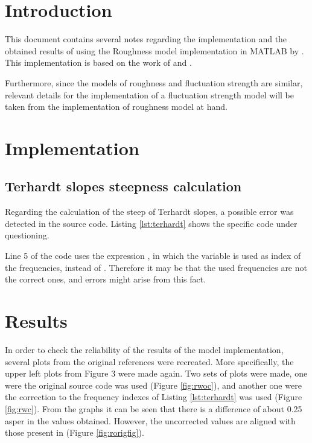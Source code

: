 \documentclass[a4paper]{article}
\begin{document}

\section{Introduction} 

This document contains several notes regarding the implementation and the
obtained results of using the Roughness model implementation in MATLAB by
\citet{Schrader2002}. This implementation is based on the work of
\cite{aures1985berechnungsverfahren} and \citet{daniel1997psychoacoustical}.

Furthermore, since the models of roughness and fluctuation strength are similar,
relevant details for the implementation of a fluctuation strength model will be
taken from the implementation of roughness model at hand.

\section{Implementation}

\subsection{Terhardt slopes steepness calculation}

Regarding the calculation of the steep of Terhardt slopes, a possible error was
detected in the source code. Listing \ref{lst:terhardt} shows the specific code
under questioning.



Line 5 of the code uses the expression ,
in which the variable  is used as index of the frequencies,
instead of . Therefore it may be that the used
frequencies are not the correct ones, and errors might arise from this fact.

\section{Results}

In order to check the reliability of the results of the model implementation,
several plots from the original references were recreated. More specifically,
the upper left plots from Figure 3 \cite[pp.~118]{daniel1997psychoacoustical}
were made again. Two sets of plots were made, one were the original source code
was used (Figure \ref{fig:rwoc}), and another one were the correction to the
frequency indexes of Listing \ref{lst:terhardt} was used (Figure \ref{fig:rwc}).
From the graphs it can be seen that there is a difference of about 0.25 asper in
the values obtained. However, the uncorrected values are aligned with those
present in \citeauthor{daniel1997psychoacoustical} (Figure \ref{fig:rorigfig}).
\end{document}
